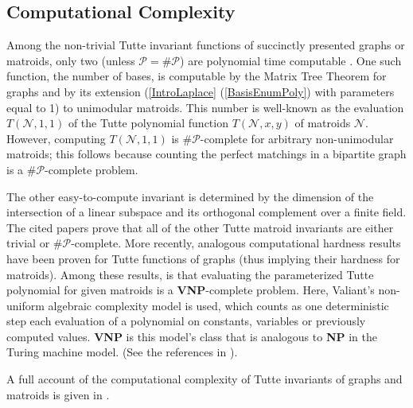 \documentclass[12pt]{article}
\theoremstyle{definition}
\begin{document}
\subsection{Computational Complexity}
\label{Complexity}

Among the non-trivial Tutte
invariant functions of 
succinctly presented graphs or matroids,
only two (unless $\mathcal{P}=\mathcal{\#P}$)
are polynomial time 
computable
\cite{JaegerVertiganWelsh,MR99k:05053}.
One such function,
the number of bases,
is computable by the Matrix Tree Theorem
for graphs and by its extension (\textsection \ref{IntroLaplace}
(\ref{BasisEnumPoly}) with parameters equal to 1) 
to unimodular matroids.  
This number 
is well-known as the evaluation $T(\mathcal{N},1,1)$ of the 
Tutte polynomial
function $T(\mathcal{N},x,y)$ of matroids $\mathcal{N}$.
However, 
computing $T(\mathcal{N},1,1)$ 
is $\#\mathcal{P}$-complete 
for arbitrary non-unimodular matroids\cite{VertiganBaseCounting}; this follows
because counting the perfect matchings in a bipartite graph is 
a $\#\mathcal{P}$-complete problem\cite{ValiantNumPComplete}.

The other easy-to-compute invariant is
determined by the 
dimension of the intersection of a linear subspace and its orthogonal
complement over a finite field\cite{MR99k:05053}.
The cited papers prove
that all of the other Tutte
matroid invariants are
either trivial or $\#\mathcal{P}$-complete.
More recently, analogous computational hardness results have been
proven for
Tutte functions of graphs (thus implying 
their hardness for matroids).
Among these results, 
is that  evaluating
the parameterized Tutte polynomial for given matroids
is a \textbf{VNP}-complete problem\cite{MakowskyLotzComplexity}.
Here, Valiant's non-uniform algebraic complexity model\cite{ValiantNonUnif}
is used, which 
counts as one 
deterministic
step each evaluation of a
polynomial on
constants, variables or previously
computed values.
\textbf{VNP} is this model's class that is analogous to 
\textbf{NP} in the Turing machine model.
(See the references in \cite{MakowskyLotzComplexity}).

A full account of 
the computational 
complexity
of Tutte
invariants of graphs and matroids is given in
\cite{JaegerVertiganWelsh,MR94m:57027,MR99k:05053,OxleyWelshTuttePolyPolyTime,
WelshRandomApprox,WelshApproxCounting}.
\end{document}
